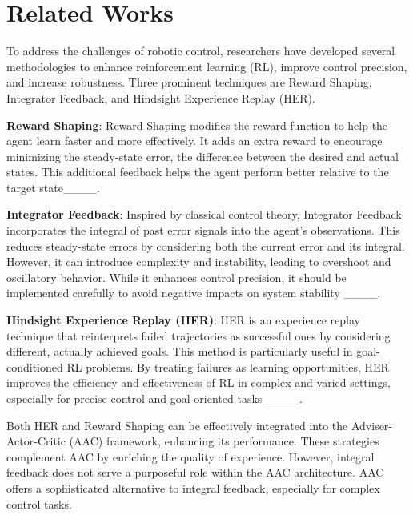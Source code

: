 \section{Related Works}
To address the challenges of robotic control, researchers have developed several methodologies to enhance reinforcement learning (RL), improve control precision, and increase robustness. Three prominent techniques are Reward Shaping, Integrator Feedback, and Hindsight Experience Replay (HER).

\textbf{Reward Shaping}:
Reward Shaping modifies the reward function to help the agent learn faster and more effectively. It adds an extra reward to encourage minimizing the steady-state error, the difference between the desired and actual states. This additional feedback helps the agent perform better relative to the target state____.

\textbf{Integrator Feedback}:
Inspired by classical control theory, Integrator Feedback incorporates the integral of past error signals into the agent's observations. This reduces steady-state errors by considering both the current error and its integral.  However, it can introduce complexity and instability, leading to overshoot and oscillatory behavior. While it enhances control precision, it should be implemented carefully to avoid negative impacts on system stability ____.

\textbf{Hindsight Experience Replay (HER)}:
HER is an experience replay technique that reinterprets failed trajectories as successful ones by considering different, actually achieved goals. This method is particularly useful in goal-conditioned RL problems. By treating failures as learning opportunities, HER improves the efficiency and effectiveness of RL in complex and varied settings, especially for precise control and goal-oriented tasks ____.

Both HER and Reward Shaping can be effectively integrated into the Adviser-Actor-Critic (AAC) framework, enhancing its performance. These strategies complement AAC by enriching the quality of experience. However, integral feedback does not serve a purposeful role within the AAC architecture. AAC offers a sophisticated alternative to integral feedback, especially for complex control tasks.